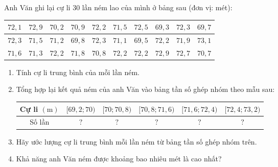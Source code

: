 \begin{bt}%
	Anh Văn ghi lại cự li 30 lần ném lao của mình ở bảng sau (đơn vị: mét):
	\begin{center}
		\begin{tabular}{|c|c|c|c|c|c|c|c|c|c|}
			\hline $72{,}1$ & $72{,}9$ & $70{,}2$ & $70{,}9$ & $72{,}2$ & $71{,}5$ & $72{,}5$ & $69{,}3$ & $72{,}3$ & $69{,}7$ \\
			\hline $72{,}3$ & $71{,}5$ & $71{,}2$ & $69{,}8$ & $72{,}3$ & $71{,}1$ & $69{,}5$ & $72{,}2$ & $71{,}9$ & $73{,}1$ \\
			\hline $71{,}6$ & $71{,}3$ & $72{,}2$ & $71{,}8$ & $70{,}8$ & $72{,}2$ & $72{,}2$ & $72{,}9$ & $72{,}7$ & $70{,}7$ \\
			\hline
		\end{tabular}
	\end{center}
	\begin{enumerate}
		\item Tính cự li trung bình của mỗi lần ném.
		\item Tổng hợp lại kết quả ném của anh Văn vào bảng tần số ghép nhóm theo mẫu sau:
		      \begin{center}
			      \begin{tabular}{|c|c|c|c|c|c|}
				      \hline Cự li $(\mathrm{m})$ & {$[69{,}2; 70)$} & {$[70; 70{,}8)$} & {$[70{,}8; 71{,}6)$} & {$[71{,}6; 72{,}4)$} & {$[72{,}4; 73{,}2)$} \\
				      \hline Số lần               & $?$              & $?$              & $?$                  & $?$                  & $?$                  \\
				      \hline
			      \end{tabular}
		      \end{center}
		\item Hãy ước lượng cự li trung bình mỗi lần ném từ bảng tần số ghép nhóm trên.
		\item Khả năng anh Văn ném được khoảng bao nhiêu mét là cao nhất?
	\end{enumerate}
\end{bt}
